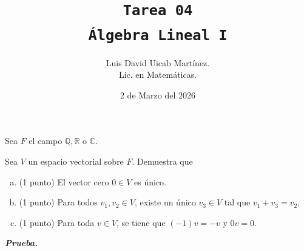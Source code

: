 \documentclass[11pt]{scrartcl}
\title{\texttt{Tarea 04
\\ Álgebra Lineal I}}
\author{Luis David Uicab Martínez. 
\\Lic. en Matemáticas.}
\date{2 de Marzo del 2026}
\begin{document}
\maketitle
Sea $F$ el campo $\mathbb{Q},\mathbb{R}$ o $\mathbb{C}$.
\begin{mdframed}[style=mdpurplebox, frametitle={Ejercicio 1, Tarea 05, Álgebra Lineal I}]
    Sea $V$ un espacio vectorial sobre $F$. Demuestra que
    \begin{enumerate}[a)]
        \item (1 punto) El vector cero $0\in V$ es único.
        \item (1 punto) Para todos $v_1,v_2\in V$, existe un único $v_3\in V$ tal que $v_1+v_3=v_2$.
        \item (1 punto) Para toda $v \in V$, se tiene que $(-1)v=-v$ y $0v=0$.  
    \end{enumerate}
\end{mdframed}
    \textit{\textbf{Prueba.}}
\end{document}
